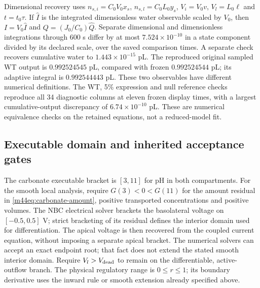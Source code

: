 Dimensional recovery uses $n_{s,i}=C_0V_0x_s$,
$n_{s,l}=C_0L_0y_s$, $V_i=V_0v$, $V_l=L_0\ell$ and $t=t_0\tau$.
If $\widehat I$ is the integrated dimensionless water observable scaled by
$V_0$, then $I=V_0\widehat I$ and $Q=(J_0/C_0)\widehat Q$.
Separate dimensional and dimensionless integrations through 600 s differ by
at most $7.524\times10^{-10}$ in a state component divided by its declared
scale, over the saved comparison times. A separate check recovers cumulative
water to $1.443\times10^{-15}$ pL. The reproduced original sampled WT output
is $0.992524545$ pL, compared with frozen $0.992524544$ pL; its adaptive
integral is $0.992544443$ pL. These two observables have different numerical
definitions. The WT, 5\% expression and null reference checks reproduce
all 34 diagnostic columns at eleven frozen display times, with a largest
cumulative-output discrepancy of $6.74\times10^{-10}$ pL. These are numerical
equivalence checks on the retained equations, not a reduced-model fit.

\subsection{Executable domain and inherited acceptance gates}
The carbonate executable bracket is $[3,11]$ for pH in both compartments.
For the smooth local analysis, require $G(3)<0<G(11)$ for the amount residual
in \eqref{m44eq:carbonate-amount}, positive transported concentrations and
positive volumes. The NBC electrical solver brackets the basolateral
voltage on $[-0.5,0.5]$ V; strict bracketing of its residual defines the
interior domain used for differentiation. The apical voltage is then
recovered from the coupled current equation, without imposing a separate
apical bracket. The numerical solvers can accept an exact endpoint root;
that fact does not extend the stated smooth interior domain. Require
$V_l>V_{\rm dead}$ to remain on the differentiable, active-outflow branch.
The physical regulatory range is $0\leq r\leq1$; its boundary derivative
uses the inward rule or smooth extension already specified above.

